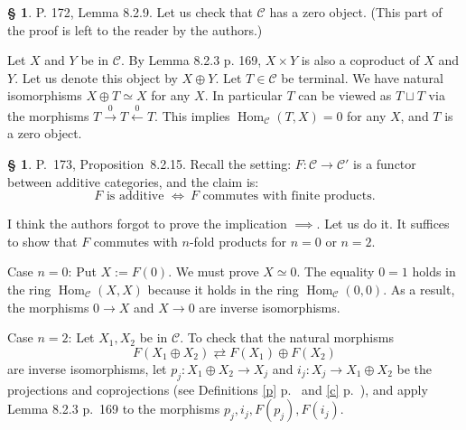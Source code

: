 \documentclass[12pt]{article}
\theoremstyle{remark}
\theoremstyle{definition}
\newtheorem{cm}[thm]{\S}
\newcommand{\bc}{\begin{cm}}\newcommand{\ec}{\end{cm}}
\newcommand{\C}{\mathcal C}
\newcommand{\xl}{\xleftarrow}
\newcommand{\xr}{\xrightarrow}
\newcommand{\be}{\begin{equation}}
\newcommand{\ee}{\end{equation}}
\newcommand{\pr}{Proposition}
\DeclareMathOperator{\Hom}{Hom}
\DeclareMathOperator{\h}{Hom}
\begin{document}

\bc P. 172, Lemma 8.2.9. Let us check that $\C$ has a zero object. (This part of the proof is left to the reader by the authors.) 

Let $X$ and $Y$ be in $\C$. By Lemma 8.2.3 p. 169, $X\times Y$ is also a coproduct of $X$ and $Y$. Let us denote this object by $X\oplus Y$. Let $T\in\C$ be terminal. We have natural isomorphisms $X\oplus T\simeq X$ for any $X$. In particular $T$ can be viewed as $T\sqcup T$ via the morphisms $T\xr0T\xl0T$. This implies $\h_\C(T,X)=0$ for any $X$, and $T$ is a zero object.
\ec 


\bc P.~173, \pr\ 8.2.15. Recall the setting: $F:\C\to\C'$ is a functor between additive categories, and the claim is: 
$$
F\text{ is additive }\iff\ F\text{ commutes with finite products}.
$$ 

I think the authors forgot to prove the implication $\implies$. Let us do it. It suffices to show that $F$ commutes with $n$-fold products for $n=0$ or $n=2$. 

Case $n=0$: Put $X:=F(0)$. We must prove $X\simeq 0$. The equality $0=1$ holds in the ring $\Hom_\C(X,X)$ because it holds in the ring $\Hom_\C(0,0)$. As a result, the morphisms $0\to X$ and $X\to 0$ are inverse isomorphisms. 

Case $n=2$: Let $X_1,X_2$ be in $\C$. To check that the natural morphisms 
%
\be\label{173} 
F(X_1\oplus X_2)\rightleftarrows F(X_1)\oplus F(X_2)
\ee 
% 
are inverse isomorphisms, let $p_j:X_1\oplus X_2\to X_j$ and $i_j:X_j\to X_1\oplus X_2$ be the projections and coprojections (see Definitions \ref{p} p.~\pageref{p} and \ref{c} p.~\pageref{c}), and apply Lemma 8.2.3 p.~169 to the morphisms $p_j,i_j,F(p_j),F(i_j)$.
\ec 

\end{document}
